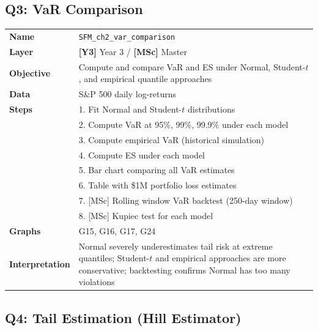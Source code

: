 \documentclass[11pt, a4paper]{article}
\newcommand{\layerY}[1]{\textcolor{MainBlue}{\textbf{[Y3]}} #1}
\newcommand{\layerM}[1]{\textcolor{Forest}{\textbf{[MSc]}} #1}
\theoremstyle{definition}
\begin{document}
\subsection{Q3: VaR Comparison}

\begin{tabular}{l p{12cm}}
\toprule
\textbf{Name} & \texttt{SFM\_ch2\_var\_comparison} \\
\textbf{Layer} & \layerY{Year 3} / \layerM{Master} \\
\textbf{Objective} & Compute and compare VaR and ES under Normal, Student-$t$, and empirical quantile approaches \\
\textbf{Data} & S\&P 500 daily log-returns \\
\textbf{Steps} &
  1. Fit Normal and Student-$t$ distributions \\
  & 2. Compute VaR at 95\%, 99\%, 99.9\% under each model \\
  & 3. Compute empirical VaR (historical simulation) \\
  & 4. Compute ES under each model \\
  & 5. Bar chart comparing all VaR estimates \\
  & 6. Table with \$1M portfolio loss estimates \\
  & 7. [MSc] Rolling window VaR backtest (250-day window) \\
  & 8. [MSc] Kupiec test for each model \\
\textbf{Graphs} & G15, G16, G17, G24 \\
\textbf{Interpretation} & Normal severely underestimates tail risk at extreme quantiles; Student-$t$ and empirical approaches are more conservative; backtesting confirms Normal has too many violations \\
\bottomrule
\end{tabular}

\subsection{Q4: Tail Estimation (Hill Estimator)}
\end{document}
